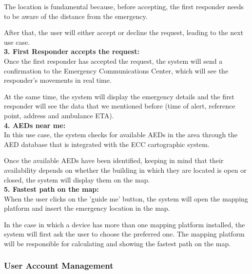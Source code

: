 \documentclass[11pt,a4paper]{article}
\begin{document}
The location is fundamental because, before accepting, the first responder needs to be aware of the distance from the emergency.

After that, the user will either accept or decline the request, leading to the next use case. \\

\textbf{3. First Responder accepts the request:} \\

Once the first responder has accepted the request, the system will send a confirmation to the Emergency Communications Center, which will see the responder's movements in real time.

At the same time, the system will display the emergency details and the first responder will see the data that we mentioned before (time of alert, reference point, address and ambulance ETA). \\

\textbf{4. AEDs near me:} \\

In this use case, the system checks for available AEDs in the area through the AED database that is integrated with the ECC cartographic system.

Once the available AEDs have been identified, keeping in mind that their availability depends on whether the building in which they are located is open or closed, the system will display them on the map. \\

\textbf{5. Fastest path on the map:} \\

When the user clicks on the 'guide me' button, the system will open the mapping platform and insert the emergency location in the map.

In the case in which a device has more than one mapping platform installed, the system will first ask the user to choose the preferred one.
%
The mapping platform will be responsible for calculating and showing the fastest path on the map.

\subsubsection{User Account Management}
\end{document}

